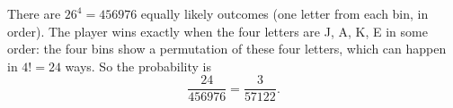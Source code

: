 There are $26^4=456976$ equally likely outcomes (one letter from each bin, in order). The player wins exactly when the four letters are J, A, K, E in some order: the four bins show a permutation of these four letters, which can happen in $4!=24$ ways. So the probability is
\[\dfrac{24}{456976}=\boxed{\dfrac{3}{57122}}.\]
